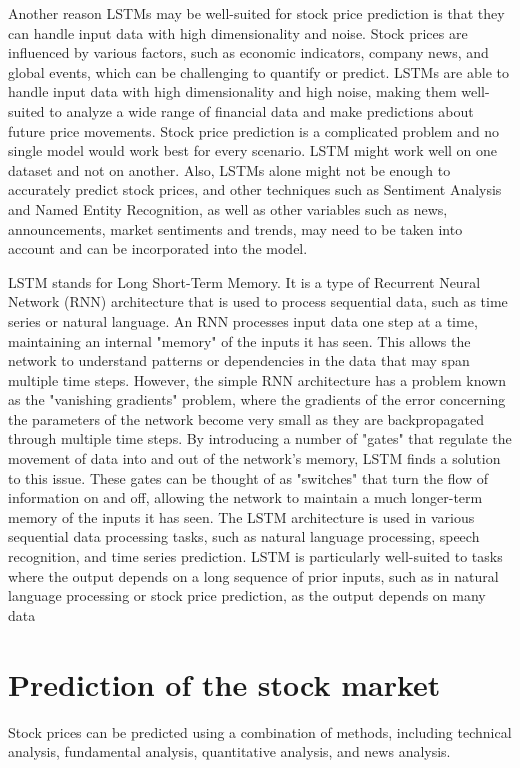 Another reason LSTMs may be well-suited for stock price prediction is that they can handle input data with high dimensionality and noise. Stock prices are influenced by various factors, such as economic indicators, company news, and global events, which can be challenging to quantify or predict. LSTMs are able to handle input data with high dimensionality and high noise, making them well-suited to analyze a wide range of financial data and make predictions about future price movements.
Stock price prediction is a complicated problem and no single model would work best for every scenario. LSTM might work well on one dataset and not on another. Also, LSTMs alone might not be enough to accurately predict stock prices, and other techniques such as Sentiment Analysis and Named Entity Recognition, as well as other variables such as news, announcements, market sentiments and trends, may need to be taken into account and can be incorporated into the model.
\par
LSTM stands for Long Short-Term Memory. It is a type of Recurrent Neural Network (RNN) architecture that is used to process sequential data, such as time series or natural language.
An RNN processes input data one step at a time, maintaining an internal "memory" of the inputs it has seen. This allows the network to understand patterns or dependencies in the data that may span multiple time steps. However, the simple RNN architecture has a problem known as the "vanishing gradients" problem, where the gradients of the error concerning the parameters of the network become very small as they are backpropagated through multiple time steps.
By introducing a number of "gates" that regulate the movement of data into and out of the network's memory, LSTM finds a solution to this issue. These gates can be thought of as "switches" that turn the flow of information on and off, allowing the network to maintain a much longer-term memory of the inputs it has seen.
The LSTM architecture is used in various sequential data processing tasks, such as natural language processing, speech recognition, and time series prediction. LSTM is particularly well-suited to tasks where the output depends on a long sequence of prior inputs, such as in natural language processing or stock price prediction, as the output depends on many data

\section*{Prediction of the stock market}
Stock prices can be predicted using a combination of methods, including technical analysis, fundamental analysis, quantitative analysis, and news analysis.

